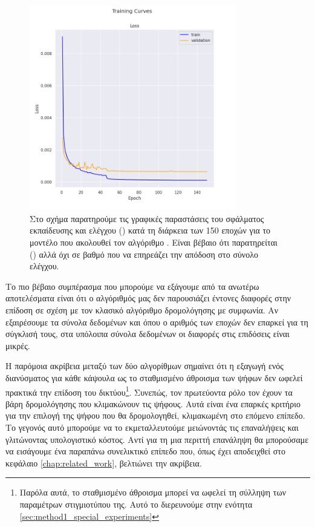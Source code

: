 \begin{figure}[h]
    \centering
    \includegraphics[width=0.8\textwidth]{images/chapter experiments/method 1/image 5/train_curve.png}
    \caption{Στο σχήμα παρατηρούμε τις γραφικές παραστάσεις του σφάλματος εκπαίδευσης και ελέγχου () κατά τη διάρκεια των 150 εποχών για το μοντέλο που ακολουθεί τον αλγόριθμο . Είναι βέβαιο ότι παρατηρείται () αλλά όχι σε βαθμό που να επηρεάζει την απόδοση στο σύνολο ελέγχου.}
    \label{fig:exp_method_1_best_alg}
  \end{figure}

Το πιο βέβαιο συμπέρασμα που μπορούμε να εξάγουμε από τα ανωτέρω αποτελέσματα είναι ότι ο αλγόριθμός μας  δεν παρουσιάζει έντονες διαφορές στην επίδοση σε σχέση με τον κλασικό αλγόριθμο δρομολόγησης με συμφωνία. Αν εξαιρέσουμε τα σύνολα δεδομένων  και  όπου ο αριθμός των εποχών δεν επαρκεί για τη σύγκλισή τους, στα υπόλοιπα σύνολα δεδομένων οι διαφορές στις επιδόσεις είναι μικρές.\par

Η παρόμοια ακρίβεια μεταξύ των δύο αλγορίθμων σημαίνει ότι η εξαγωγή ενός διανύσματος για κάθε κάψουλα  ως το σταθμισμένο άθροισμα των ψήφων δεν ωφελεί πρακτικά την επίδοση του δικτύου\footnote{Παρόλα αυτά, το σταθμισμένο άθροισμα μπορεί να ωφελεί τη σύλληψη των παραμέτρων στιγμιοτύπου της. Αυτό το διερευνούμε στην ενότητα \ref{sec:method1_special_experiments}}. Συνεπώς, τον πρωτεύοντα ρόλο τον έχουν τα βάρη δρομολόγησης που κλιμακώνουν τις ψήφους. Αυτά είναι ένα επαρκές κριτήριο για την επιλογή της ψήφου που θα δρομολογηθεί, κλιμακωμένη στο επόμενο επίπεδο. Το γεγονός αυτό μπορούμε να το εκμεταλλευτούμε μειώνοντάς τις επαναλήψεις και γλιτώνοντας υπολογιστικό κόστος. Αντί για τη μια περιττή επανάληψη θα μπορούσαμε να εισάγουμε ένα παραπάνω συνελικτικό επίπεδο που, όπως έχει αποδειχθεί στο κεφάλαιο \ref{chap:related_work}, βελτιώνει την ακρίβεια.\par 

